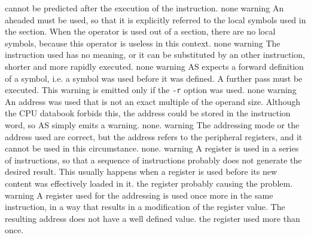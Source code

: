 \documentclass[12pt,twoside]{report}
\newcommand{\tty}[1]{{\tt #1}}
\begin{document}
\begin{description}
{                cannot be predicted after the execution of the
                instruction.}
               {none}
               {warning}
               {An aheaded \@ must be used, so that it is
                explicitly referred to the local symbols used in the
                section. When the operator is used out of a section, there
                are no local symbols, because this operator is useless in
                this context.}
               {none}
               {warning}
               {The instruction used has no meaning, or it can be
                substituted by an other instruction, shorter and more
                rapidly executed.}
               {none}
               {warning}
               {AS expects a forward definition of a symbol, i.e. a symbol
                was used before it was defined. A further pass must be
                executed. This warning is emitted only if the \tty{-r} option was
                used.}
               {none}
               {warning}
               {An address was used that is not an exact multiple of the
                operand size. Although the CPU databook forbids this, the
                address could be stored in the instruction word, so AS
                simply emits a warning.}
               {none.}
               {warning}
               {The addressing mode or the address used are correct, but the
                address refers to the peripheral registers, and it
                cannot be used in this circumstance.}
               {none.}
               {warning}
               {A register is used in a series of instructions, so that a
                sequence of instructions probably does not generate the
                desired result. This usually happens when a register is
                used before its new content was effectively loaded in it.}
               {the register probably causing the problem.}
               {warning}
               {A register used for the addressing is used once more in the
                same instruction, in a way that results in a modification
                of the register value. The resulting address does not have a
                well defined value.}
               {the register used more than once.}

\end{description}
\end{document}
